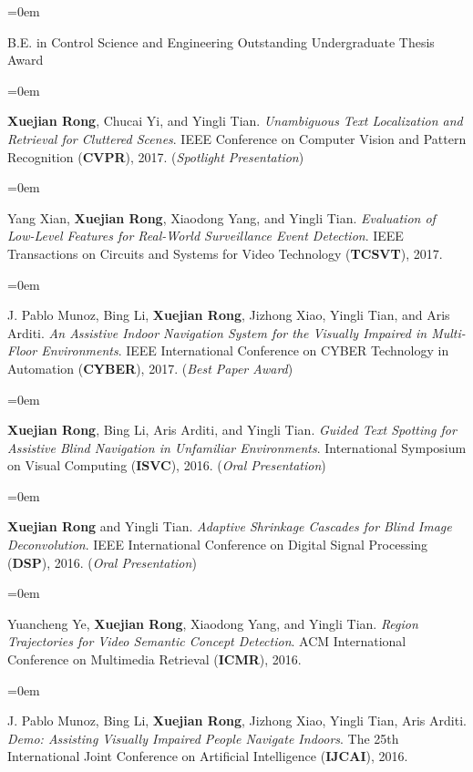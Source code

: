 \documentclass{scrartcl}
\newcommand{\Description}[1]{\hangindent=0em\hangafter=0\noindent\raggedright\footnotesize{#1}\par\normalsize\vspace{1em}} %
\begin{document}
\begin{cv}{}
\Description{B.E. in Control Science and Engineering \qquad Outstanding Undergraduate Thesis Award}

\vspace{2.0em} %


\noindent{}\vspace{0.8em}

\Description{\scriptsize
\textbf{Xuejian Rong}, Chucai Yi, and Yingli Tian. \textit{Unambiguous Text Localization and Retrieval for Cluttered Scenes}. IEEE Conference on Computer Vision and Pattern Recognition (\textbf{CVPR}), 2017. (\textit{Spotlight Presentation})}

\Description{\scriptsize
Yang Xian, \textbf{Xuejian Rong}, Xiaodong Yang, and Yingli Tian. \textit{Evaluation of Low-Level Features for Real-World Surveillance Event Detection}. IEEE Transactions on Circuits and Systems for Video Technology (\textbf{TCSVT}), 2017.}

\Description{\scriptsize
J. Pablo Munoz, Bing Li, \textbf{Xuejian Rong}, Jizhong Xiao, Yingli Tian, and Aris Arditi. \textit{An Assistive Indoor Navigation System for the Visually Impaired in Multi-Floor Environments}. IEEE International Conference on CYBER Technology in Automation (\textbf{CYBER}), 2017. (\textit{Best Paper Award})}

\Description{\scriptsize
\textbf{Xuejian Rong}, Bing Li, Aris Arditi, and Yingli Tian. \textit{Guided Text Spotting for Assistive Blind Navigation in Unfamiliar Environments}. International Symposium on Visual Computing (\textbf{ISVC}), 2016. (\textit{Oral Presentation})}

\Description{\scriptsize
\textbf{Xuejian Rong} and Yingli Tian. \textit{Adaptive Shrinkage Cascades for Blind Image Deconvolution}. IEEE International Conference on Digital Signal Processing (\textbf{DSP}), 2016. (\textit{Oral Presentation})}

\Description{\scriptsize
Yuancheng Ye, \textbf{Xuejian Rong}, Xiaodong Yang, and Yingli Tian. \textit{Region Trajectories for Video Semantic Concept Detection}. ACM International Conference on Multimedia Retrieval (\textbf{ICMR}), 2016.}

\Description{\scriptsize
J. Pablo Munoz, Bing Li, \textbf{Xuejian Rong}, Jizhong Xiao, Yingli Tian, Aris Arditi. \textit{Demo: Assisting Visually Impaired People Navigate Indoors}. The 25th International Joint Conference on Artificial Intelligence (\textbf{IJCAI}), 2016.}


\end{cv}
\end{document}

